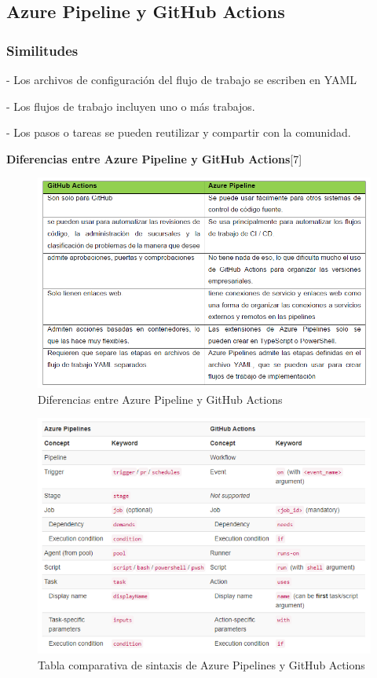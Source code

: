 \documentclass[twoside,twocolumn]{article}
\begin{document}
\subsection{Azure Pipeline y GitHub Actions}



\subsubsection{Similitudes}
- Los archivos de configuración del flujo de trabajo se escriben en YAML

- Los flujos de trabajo incluyen uno o más trabajos.

- Los pasos o tareas se pueden reutilizar y compartir con la comunidad.

\textbf{Diferencias entre Azure Pipeline y GitHub Actions}[7]

\begin{figure}[htb]
\centering
\includegraphics[width=1\textwidth]{./Imagenes/2.png}
\caption{Diferencias entre Azure Pipeline y GitHub Actions}
\label{fig:mont}
\end{figure}


\begin{figure}[t]
    \begin{center}
        \includegraphics[width = \columnwidth]{./Imagenes/1 iwr4M9D-eSbMV8ki5xbU2w.png}
        \caption{Tabla comparativa de sintaxis de Azure Pipelines y GitHub Actions}
    \end{center}
\end{figure}
\end{document}
